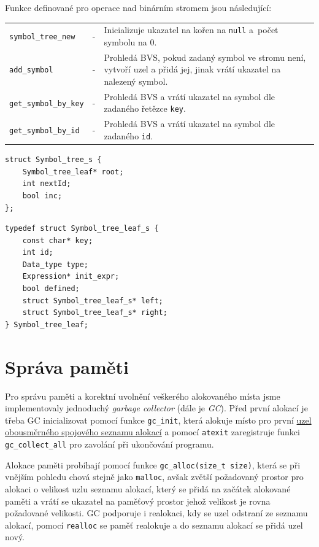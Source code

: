 \documentclass[a4paper,11pt]{article}
\begin{document}
Funkce definované pro operace nad binárním stromem jsou následující:\medskip

\begin{tabular}{llp{11.9cm}}
	\texttt{symbol\_tree\_new}  & - & Inicializuje ukazatel na kořen na \texttt{null} a~počet symbolu na 0.\\
	\texttt{add\_symbol}    & - & Prohledá BVS, pokud zadaný symbol ve stromu není, vytvoří uzel a přidá jej, jinak vrátí ukazatel na nalezený symbol. \\
	\texttt{get\_symbol\_by\_key} & - & Prohledá BVS a vrátí ukazatel na symbol dle zadaného řetězce \texttt{key}. \\	
	\texttt{get\_symbol\_by\_id} & - & Prohledá BVS a vrátí ukazatel na symbol dle zadaného \texttt{id}. \\
\end{tabular}
\medskip	
\begin{lstlisting}[caption={Struktura binárního stromu}, label={lst:stBvsStruct}]
struct Symbol_tree_s {
    Symbol_tree_leaf* root;
    int nextId;
    bool inc;
};
\end{lstlisting}

\begin{lstlisting}[caption={Struktura uzlu binárního stromu}, label={lst:stBvsLeafStruct}]
typedef struct Symbol_tree_leaf_s {
    const char* key;
    int id;
    Data_type type;
    Expression* init_expr;
    bool defined;
    struct Symbol_tree_leaf_s* left;
    struct Symbol_tree_leaf_s* right;
} Symbol_tree_leaf;
\end{lstlisting}

\section{Správa paměti}
Pro správu paměti a korektní uvolnění veškerého alokovaného místa jsme implementovaly jednoduchý \emph{garbage collector} (dále je \emph{GC}). 
Před první alokací je třeba GC inicializovat pomocí funkce \texttt{gc\_init}, která alokuje místo pro první \hyperref[lst:gcAllocAtom]{uzel obousměrného spojového seznamu alokací} a pomocí \texttt{atexit} zaregistruje funkci \texttt{gc\_collect\_all} pro zavolání při ukončování programu.

Alokace paměti probíhají pomocí funkce \texttt{gc\_alloc(size\_t size)}, která se při vnějším pohledu chová stejně jako \texttt{malloc}, avšak zvětší požadovaný prostor pro alokaci o velikost uzlu seznamu alokací, který se přidá na začátek alokované paměti a vrátí se ukazatel na paměťový prostor jehož velikost je rovna požadované velikosti.
GC podporuje i realokaci, kdy se uzel odstraní ze seznamu alokací, pomocí \texttt{realloc} se paměť realokuje a do seznamu alokací se přidá uzel nový.
\end{document}
